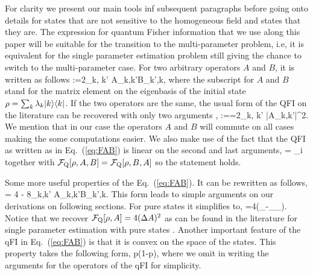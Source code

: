 For clarity we present our main tools inf subsequent paragraphs before going onto details for states that are not sensitive to the homogeneous field and states that they are.
The expression for quantum Fisher information that we use along this paper will be suitable for the transition to the multi-parameter problem, i.e, it is equivalent for the single parameter estimation problem still giving the chance to switch to the multi-parameter case.
For two arbitrary operators $A$ and $B$, it is written as follows
\be
  \label{eq:FAB}
  :=2\sum_{k, k'}
  {A}_{k,k'}{B}_{k',k},
\ee
where the subscript for $A$ and $B$ stand for the matrix element on the eigenbasis of the initial state $\rho = \sum_k\lambda_k\vert k \rangle\langle k \vert$.
If the two operators are the same, the usual form of the QFI on the literature can be recovered with only two arguments \cite{Paris2009,Braunstein1994,Holevo1982,Helstrom1976,Petz2002,Petz2008},
\be
  :==2\sum_{k, k'}
  |{A}_{k,k'}|^2.
\ee
We mention that in our case the operators $A$ and $B$ will commute on all cases making the some computations easier.
We also make use of the fact that the QFI as written as in Eq.~(\ref{eq:FAB}) is linear on the second and last arguments,
\be
  \label{eq:qfi-linear-in-arguments}
   = \sum_i 
\ee
together with $\mathcal{F}_{\textnormal{Q}}[{\textstyle \rho, A, B}] = \mathcal{F}_{\textnormal{Q}}[{\textstyle \rho, B,A}]$ so the statement holds.

Some more useful properties of the Eq.~(\ref{eq:FAB}).
It can be rewritten as follows,
\be
  \label{eq:QFI for two operators rewrited}
   = 4 
  - 8\sum_{k,k'}
  {A}_{k,k'}{B}_{k',k}.
\ee
This form leads to simple arguments on our derivations on following sections.
For pure states it simplifies to,
\be
  \label{eq:QFI_pure}
  =4\left(_{\psi}-_{\psi}_{\psi}\right).
\ee
Notice that we recover $\mathcal{F}_{\textnormal{Q}}[{\textstyle \rho,A}]=4(\Delta A)^2$ as can be found in the literature for single parameter estimation with pure states \cite{Paris2009,Toth2013}.
Another important feature of the qFI in Eq.~(\ref{eq:FAB}) is that it is convex on the space of the states.
This property takes the following form,
\be
  \leqslant
  p(1{-}p),
\ee
where we omit in writing the arguments for the operators of the qFI for simplicity.

